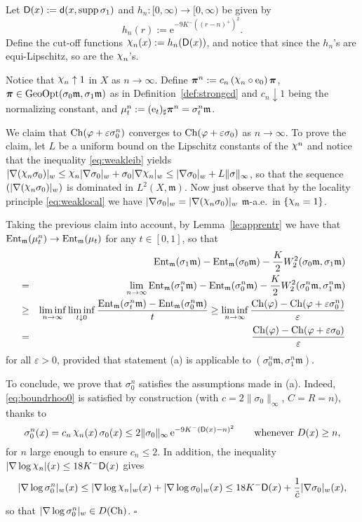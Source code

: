 \documentclass[reqno,11pt]{article}
\numberwithin{equation}{section}
\newcommand{\C}{\mathbb{C}}
\newcommand{\mm}{{\mbox{\boldmath$m$}}}
\newcommand{\ppi}{{\mbox{\boldmath$\pi$}}}
\newcommand{\sfd}{{\sf d}}
\newcommand{\sfD}{{\sf D}}
\newcommand{\rme}{{\mathrm e}}
\newcommand{\supp}{\mathop{\rm supp}\nolimits}   %
\newcommand{\eps}{\varepsilon}
\newcommand{\nchi}{{\raise.3ex\hbox{$\chi$}}}
\newenvironment{proof}{\removelastskip\par\medskip   %
\noindent{\em Proof.}
\rm}{\penalty-20\null\hfill$\square$\par\medbreak}
\newcommand{\ent}[1]{{\rm Ent}_{\mm}(#1)}              %
\newcommand{\e}{{\rm{e}}}                           %
\newcommand{\gopt}{{\rm{GeoOpt}}}                   %
\newcommand{\weakgrad}[1]{|\nabla #1|_w}                %
\renewcommand{\C}{{\rm Ch}}
\newcommand{\entr}[2]{{\rm Ent}_{#2}(#1)}              %
\renewcommand{\mm}{\mathfrak m}
\begin{document}
\begin{proof}
Let $\sfD(x):=\sfd(x,\supp\sigma_1)$ and
$h_n:[0,\infty)\to[0,\infty)$ be given by
\[
h_n(r):=\rme^{-9K^-((r-n)^+)^2}.
\]
Define the cut-off functions $\nchi_n(x):=h_n(\sfD(x))$, and notice
that since the $h_n$'s are equi-Lipschitz, so are the $\nchi_n$'s.

Notice that $\nchi_n\uparrow 1$ in $X$ as $n\to\infty$. Define
$\ppi^n:=c_n\,(\nchi_n\circ\rme_0)\,\ppi$,
$\ppi\in\gopt(\sigma_0\mm,\sigma_1\mm)$ as in
Definition~\ref{def:strongcd} and $c_n\downarrow 1$ being the
normalizing constant, and
$\mu^n_t:=(\e_t)_\sharp\ppi^n=\sigma^n_t\mm$.

We claim that $\C(\varphi+\eps\sigma_0^n)$ converges to
$\C(\varphi+\eps\sigma_0)$ as $n\to\infty$. To prove the claim, let
$L$ be a uniform bound on the Lipschitz constants of the $\nchi^n$
and notice that the inequality \eqref{eq:weakleib} yields
$\weakgrad{(\nchi_n\sigma_0)}\leq\nchi_n\weakgrad{\sigma_0}
+\sigma_0\weakgrad{\nchi_n}\leq\weakgrad{\sigma_0}+L\|\sigma\|_\infty$,
so that the sequence $(\weakgrad{(\nchi_n\sigma_0)})$ is dominated
in $L^2(X,\mm)$. Now just observe that by the locality principle
\eqref{eq:weaklocal} we have
$\weakgrad{\sigma_0}=\weakgrad{(\nchi_n\sigma_0)}$ $\mm$-a.e.~in
$\{\nchi_n=1\}$.

Taking the previous claim into account, by Lemma~\ref{le:apprentr}
we have that $\entr{\mu^n_t}\mm\to\entr{\mu_t}\mm$ for any
$t\in[0,1]$, so that
\begin{eqnarray*}
&&\ent{\sigma_1\mm}-\ent{\sigma_0\mm}-\frac{K}{2}W_2^2(\sigma_0\mm,\sigma_1\mm)\\&=&
\lim_{n\to\infty}
\ent{\sigma_1^n\mm}-\ent{\sigma^n_0\mm}-\frac{K}{2}W_2^2(\sigma^n_0\mm,\sigma^n_1\mm)\\
&\geq&\liminf_{n\to\infty}\liminf_{t\downarrow
0}\frac{\ent{\sigma_t^n\mm}-\ent{\sigma^n_0\mm}}{t}\geq
\liminf_{n\to\infty}\frac{\C(\varphi)-\C(\varphi+\eps\sigma^n_0)}{\eps}\\
&=&\frac{\C(\varphi)-\C(\varphi+\eps\sigma_0)}{\eps}
\end{eqnarray*}
for all $\eps>0$, provided that statement (a) is applicable to
$(\sigma^n_0\mm,\sigma^n_1\mm)$.

To conclude, we prove that $\sigma^n_0$ satisfies the assumptions
made in (a). Indeed, \eqref{eq:boundrhoo0} is satisfied by
construction (with $c=2\|\sigma_0\|_\infty$, $C=R=n$), thanks to
\[
\sigma^n_0(x)=c_n\,\nchi_n(x)\,\sigma_0(x)\leq 2\|\sigma_0\|_\infty
\,\rme^{-9K^-(\sfD(x)-n)^2}\qquad\text{whenever $D(x)\geq n$},
\]
for $n$ large enough to ensure $c_n\leq 2$. In addition, the
inequality $|\nabla\log\nchi_n|(x)\leq 18 K^-\sfD(x)$ gives
\[
\weakgrad{\log\sigma^n_0}(x)\leq\weakgrad{\log\nchi_n}(x)
+\weakgrad{\log\sigma_0}(x)\leq 18K^- \sfD(x)+\frac{1}{\tilde
c}\weakgrad{\sigma_0}(x),
\]
so that $\weakgrad{\log\sigma^n_0}\in D(\C)$.
\end{proof}
\end{document}
